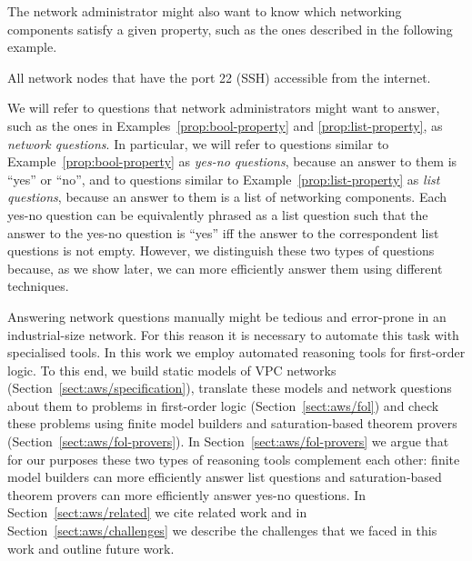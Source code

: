 The network administrator might also want to know which networking components satisfy a given property, such as the ones described in the following example.
\begin{example}\label{prop:list-property}
All network nodes that have the port 22 (SSH) accessible from the internet.
\end{example}

We will refer to questions that network administrators might want to answer, such as the ones in Examples~\ref{prop:bool-property} and \ref{prop:list-property}, as \emph{network questions}. In particular, we will refer to questions similar to Example~\ref{prop:bool-property} as \emph{yes-no questions}, because an answer to them is ``yes'' or ``no'', and to questions similar to Example~\ref{prop:list-property} as \emph{list questions}, because an answer to them is a list of networking components. Each yes-no question can be equivalently phrased as a list question such that the answer to the yes-no question is ``yes'' iff the answer to the correspondent list questions is not empty. However, we distinguish these two types of questions because, as we show later, we can more efficiently answer them using different techniques.

Answering network questions manually might be tedious and error-prone in an industrial-size network. For this reason it is necessary to automate this task with specialised tools. In this work we employ automated reasoning tools for first-order logic. To this end, we build static models of VPC networks (Section~\ref{sect:aws/specification}), translate these models and network questions about them to problems in first-order logic (Section~\ref{sect:aws/fol}) and check these problems using finite model builders and saturation-based theorem provers (Section~\ref{sect:aws/fol-provers}). In Section~\ref{sect:aws/fol-provers} we argue that for our purposes these two types of reasoning tools complement each other: finite model builders can more efficiently answer list questions and saturation-based theorem provers can more efficiently answer yes-no questions. In Section~\ref{sect:aws/related} we cite related work and in Section~\ref{sect:aws/challenges} we describe the challenges that we faced in this work and outline future work.


